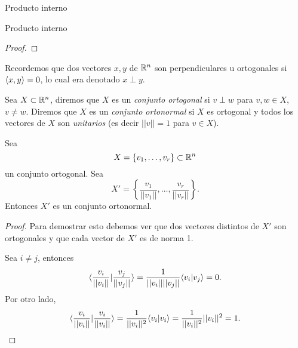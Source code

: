 \begin{chapter}{Producto interno}
\begin{section}{Producto interno}
\begin{proof}
            
        \end{proof}
        
 
        
        Recordemos que dos vectores $x,y$  de $\mathbb R^n$ son perpendiculares u ortogonales si $\langle x,y\rangle =0$, lo cual era denotado $x \perp y$. 
        
        \begin{definicion} Sea $X \subset \mathbb R^n$, diremos que $X$ es un \emph{conjunto ortogonal} si $v\perp w$ para $v,w \in X$, $v\not= w$. Diremos que $X$ es un \emph{conjunto ortonormal} si $X$ es ortogonal y todos los vectores de $X$ son  \textit{unitarios} (es decir $||v|| =1$ para $v \in X$).
        \end{definicion}
    
        
        \begin{proposicion}\label{ortogonal->ortonormal}
            Sea  $$X = \{v_1,\ldots,v_r \} \subset \mathbb R^n$$ un conjunto ortogonal. Sea 
            \begin{equation*}
                X' =  \left\{\frac{v_1}{||v_1||},\ldots,\frac{v_r}{||v_r||} \right\}.
            \end{equation*}
            Entonces $X'$ es  un conjunto ortonormal. 
        \end{proposicion}
        \begin{proof}
            Para demostrar esto debemos ver que dos vectores distintos de $X'$ son ortogonales y que cada vector de $X'$ es de norma 1.
            
            Sea $i \ne j$, entonces
            \begin{equation*}
            \langle \frac{v_i}{||v_i||} | \frac{v_j}{||v_j||}\rangle = \frac{1}{||v_i||||v_j||} \langle v_i | v_j\rangle = 0.
            \end{equation*}
            Por otro lado,
            \begin{equation*}
            \langle \frac{v_i}{||v_i||} | \frac{v_i}{||v_i||}\rangle = \frac{1}{||v_i||^2} \langle v_i | v_i\rangle=  \frac{1}{||v_i||^2}||v_i||^2 =1.
            \end{equation*}
        \end{proof}	
            
            
            
        
        
        \medskip
        

\end{section}
\end{chapter}
